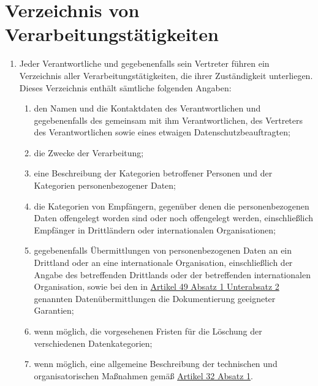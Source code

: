 \chapter{Verzeichnis von Verarbeitungstätigkeiten}
\label{ch:30}


\begin{enumerate}

  \item Jeder Verantwortliche und gegebenenfalls sein Vertreter führen ein Verzeichnis aller Verarbeitungstätigkeiten,
   die ihrer Zuständigkeit unterliegen. Dieses Verzeichnis enthält sämtliche folgenden Angaben:
  \label{itm:30-1}

  \begin{enumerate}
  
    \item den Namen und die Kontaktdaten des Verantwortlichen und gegebenenfalls des gemeinsam mit ihm Verantwortlichen,
     des Vertreters des Verantwortlichen sowie eines etwaigen Datenschutzbeauftragten;
    \label{itm:30-1a}

    \item die Zwecke der Verarbeitung;
    \label{itm:30-1b}

    \item eine Beschreibung der Kategorien betroffener Personen und der Kategorien personenbezogener Daten;
    \label{itm:30-1c}

    \item die Kategorien von Empfängern, gegenüber denen die personenbezogenen Daten offengelegt worden sind oder noch
     offengelegt werden, einschließlich Empfänger in Drittländern oder internationalen Organisationen;
    \label{itm:30-1d}

    \item gegebenenfalls Übermittlungen von personenbezogenen Daten an ein Drittland oder an eine internationale
     Organisation, einschließlich der Angabe des betreffenden Drittlands oder der betreffenden internationalen
     Organisation, sowie bei den in \hyperref[itm:49-1-2]{Artikel 49 Absatz 1 Unterabsatz 2} genannten
     Datenübermittlungen die Dokumentierung geeigneter Garantien;
    \label{itm:30-1e}

    \item wenn möglich, die vorgesehenen Fristen für die Löschung der verschiedenen Datenkategorien;
    \label{itm:30-1f}

    \item wenn möglich, eine allgemeine Beschreibung der technischen und organisatorischen Maßnahmen gemäß
     \hyperref[itm:32-1]{Artikel 32 Absatz 1}.
    \label{itm:30-1g}


\end{enumerate}
\end{enumerate}
